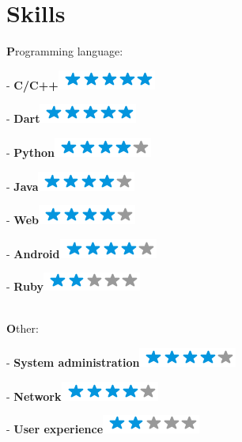 \documentclass[]{friggeri-cv}
\begin{document}
\section{Skills}
    {\Large {\textbf Programming language:}}\\
    \begin{enumerate*}
      \item[-] \textbf{C/C++}\includegraphics[scale=0.40]{img/5stars.png}
      \item[-] \textbf{Dart}\includegraphics[scale=0.40]{img/5stars.png}
      \item[-] \textbf{Python}\includegraphics[scale=0.40]{img/4stars.png}
      \item[-] \textbf{Java}\includegraphics[scale=0.40]{img/4stars.png}
      \item[-] \textbf{Web}\includegraphics[scale=0.40]{img/4stars.png}
      \item[-] \textbf{Android}\includegraphics[scale=0.40]{img/4stars.png}
      \item[-] \textbf{Ruby}\includegraphics[scale=0.40]{img/2stars.png}
    \end{enumerate*}~\\
    {\Large {\textbf Other:}}\\
    \begin{enumerate*}
      \item[-] \textbf{System administration}\includegraphics[scale=0.40]{img/4stars.png}
      \item[-] \textbf{Network}\includegraphics[scale=0.40]{img/4stars.png}
      \item[-] \textbf{User experience}\includegraphics[scale=0.40]{img/2stars.png}
    \end{enumerate*}
\end{document}
